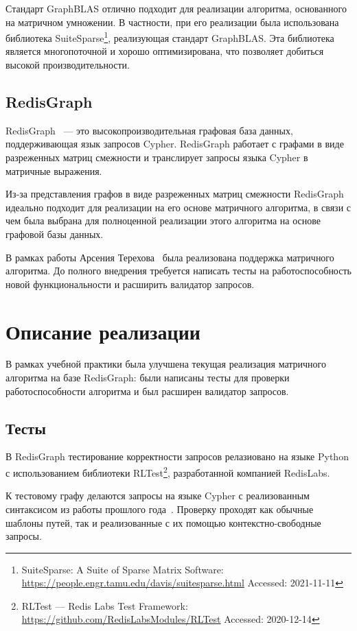 \documentclass[14pt]{matmex-diploma-custom}
\begin{document}
Стандарт GraphBLAS отлично подходит для реализации алгоритма, основанного на матричном умножении. В частности, при его реализации была использована библиотека SuiteSparse\footnote{SuiteSparse: A Suite of Sparse Matrix Software: \url{https://people.engr.tamu.edu/davis/suitesparse.html} Accessed: 2021-11-11}, реализующая стандарт GraphBLAS. Эта библиотека является многопоточной и хорошо оптимизирована, что позволяет добиться высокой производительности.

\subsection{RedisGraph}
RedisGraph~\cite{RedisGraph} --- это высокопроизводительная графовая база данных, поддерживающая язык запросов Cypher. RedisGraph работает с графами в виде разреженных матриц смежности и транслирует запросы языка Cypher в матричные выражения.

Из-за представления графов в виде разреженных матриц смежности RedisGraph идеально подходит для реализации на его основе матричного алгоритма, в связи с чем была выбрана для полноценной реализации этого алгоритма на основе графовой базы данных. 

В рамках работы Арсения Терехова~\cite{Arseniy-diploma} была реализована поддержка матричного алгоритма. До полного внедрения требуется написать тесты на работоспособность новой функциональности и расширить валидатор запросов.


\section{Описание реализации}
В рамках учебной практики была улучшена текущая реализация матричного алгоритма на базе RedisGraph: были написаны тесты для проверки работоспособности алгоритма и был расширен валидатор запросов.
\subsection{Тесты}
В RedisGraph тестирование корректности запросов релазиовано на языке Python с использованием библиотеки RLTest\footnote{RLTest --- Redis Labs Test Framework: \url{https://github.com/RedisLabsModules/RLTest} Accessed: 2020-12-14}, разработанной компанией RedisLabs.

К тестовому графу делаются запросы на языке Cypher с реализованным синтаксисом из работы прошлого года~\cite{Timur-diploma}. Проверку проходят как обычные шаблоны путей, так и реализованные с их помощью контекстно-свободные запросы.
\end{document}
